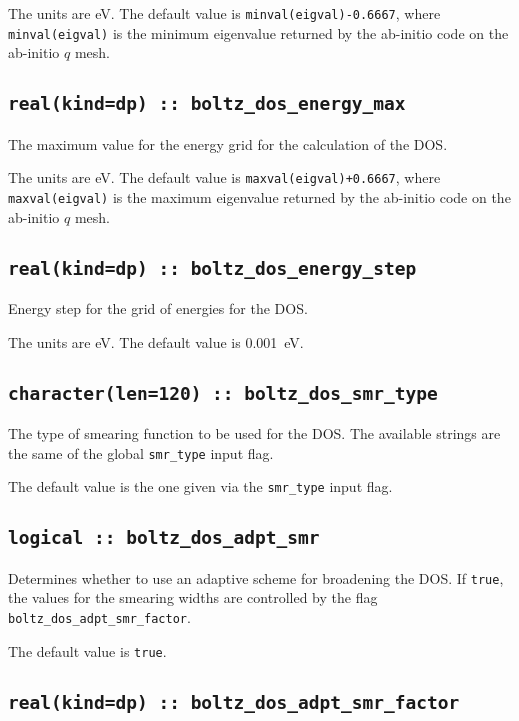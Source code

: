 The units are eV.
The default value is {\tt minval(eigval)-0.6667}, where  {\tt minval(eigval)} is the minimum eigenvalue returned by the ab-initio code on the ab-initio $q$ mesh.

\subsection[boltz\_dos\_energy\_max]{\tt real(kind=dp) :: boltz\_dos\_energy\_max}
The maximum value for the energy grid for the calculation of the DOS.

The units are eV.
The default value is {\tt maxval(eigval)+0.6667}, where  {\tt maxval(eigval)} is the maximum eigenvalue returned by the ab-initio code on the ab-initio $q$ mesh.

\subsection[boltz\_dos\_energy\_step]{\tt real(kind=dp) :: boltz\_dos\_energy\_step}
Energy step for the grid of energies for the DOS.

The units are eV.
The default value is 0.001~eV.

\subsection[boltz\_dos\_smr\_type]{\tt character(len=120) :: boltz\_dos\_smr\_type}
The type of smearing function to be used for the DOS. The available strings are the same of the global {\tt smr\_type} input flag. 

The default value is the one given via the {\tt smr\_type} input flag. 


\subsection[boltz\_dos\_adpt\_smr]{\tt logical :: boltz\_dos\_adpt\_smr}
Determines whether to use an adaptive scheme for broadening the
DOS. If \verb#true#, the values for the smearing widths are 
controlled by the flag {\tt boltz\_dos\_adpt\_smr\_factor}.

The default value is \verb#true#.



\subsection[boltz\_dos\_adpt\_smr\_factor]{\tt real(kind=dp) :: boltz\_dos\_adpt\_smr\_factor}

